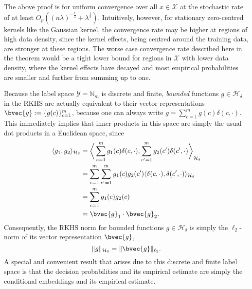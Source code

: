 \documentclass{article}
\begin{document}
	The above proof is for uniform convergence over all $x \in \mathcal{X}$ at the stochastic rate of at least $O_{p}((n \lambda)^{-\frac{1}{2}} + \lambda^{\frac{1}{2}})$. Intuitively, however, for stationary zero-centred kernels like the Gaussian kernel, the convergence rate may be higher at regions of high data density, since the kernel effects, being centred around the training data, are stronger at these regions. The worse case convergence rate described here in the theorem would be a tight lower bound for regions in $\mathcal{X}$ with lower data density, where the kernel effects have decayed and most empirical probabilities are smaller and further from summing up to one.
	
	Because the label space $\mathcal{Y} = \mathbb{N}_{m}$ is discrete and finite, \textit{bounded} functions $g \in \mathcal{H}_{\delta}$ in the RKHS are actually equivalent to their vector representations $\bvec{g} := \{g(c)\}_{c = 1}^{m}$, because one can always write $g = \sum_{c = 1}^{m} g(c) \delta(c, \cdot)$. This immediately implies that inner products in this space are simply the usual dot products in a Euclidean space, since
	\begin{equation}
		\begin{aligned}
			\langle g_{1}, g_{2} \rangle_{\mathcal{H}_{\delta}} &= \bigg\langle \sum_{c = 1}^{m} g_{1}(c) \delta(c, \cdot), \sum_{c' = 1}^{m} g_{2}(c') \delta(c', \cdot)  \bigg\rangle_{\mathcal{H}_{\delta}} \\
			&= \sum_{c = 1}^{m} \sum_{c' = 1}^{m} g_{1}(c) g_{2}(c') \langle \delta(c, \cdot), \delta(c', \cdot) \rangle_{\mathcal{H}_{\delta}} \\
			&= \sum_{c = 1}^{m} g_{1}(c) g_{2}(c) \\
			&= \bvec{g}_{1} \cdot \bvec{g}_{2}.
		\end{aligned}
	\end{equation}
	Consequently, the RKHS norm for bounded functions $g \in \mathcal{H}_{\delta}$ is simply the $\ell_{2}$-norm of its vector representation $\bvec{g}$,
	\begin{equation}
	\lVert g \rVert_{\mathcal{H}_{\delta}} = \lVert \bvec{g} \rVert_{\ell_{2}}.
	\label{eq:rkhs_norm_is_l2_norm}
	\end{equation}
	A special and convenient result that arises due to this discrete and finite label space is that the decision probabilities and its empirical estimate are simply the conditional embeddings and its empirical estimate.
	
\end{document}
